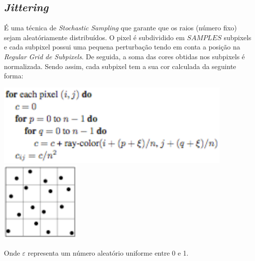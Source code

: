 \documentclass{article}
\begin{document}
        \subsection*{\textit{Jittering}}
            \par
	É uma técnica de \textit{Stochastic Sampling} que garante que os raios (número fixo) sejam aleatóriamente distribuídos. O pixel é subdividido em ${SAMPLES}$ subpixels e cada subpixel possui uma pequena perturbação tendo em conta a posição na \textit{Regular Grid de Subpixels}. De seguida, a soma das cores obtidas nos subpixels é normalizada. Sendo assim, cada subpixel tem a sua cor calculada da seguinte forma:
	\par
	\begin{center}
	\includegraphics[scale=0.65]{jittering}
	\includegraphics[scale=0.65]{jittering2}
	\end{center}
	\par
	Onde ${\varepsilon}$ representa um número aleatório uniforme entre 0 e 1.
\end{document}
